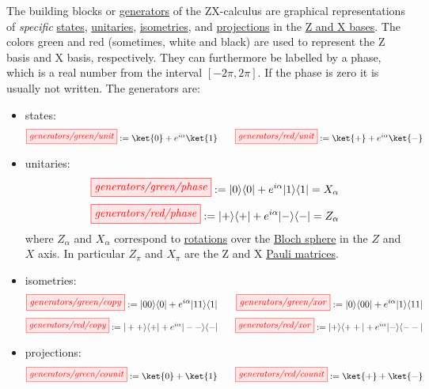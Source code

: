 \documentclass[a4paper, 12pt]{article}
\begin{document}
The building blocks or \underline{generators} of the ZX-calculus are graphical
representations of \emph{specific} \underline{states}, \underline{unitaries},
\underline{isometries}, and \underline{projections} in the \underline{Z and X
  bases}.
The colors green and red (sometimes, white and black) are used to represent the
Z basis and X basis, respectively.
They can furthermore be labelled by a phase, which is a real number from the
interval $[-2\pi, 2\pi]$.
If the phase is zero it is usually not written.
The generators are:
\begin{itemize}
\item states:
  \begin{equation*}
    \tikzfig{generators/green/unit} := \ket{0} + e^{i \alpha} \ket{1} 
    \qquad
    \tikzfig{generators/red/unit} := \ket{+} + e^{i \alpha} \ket{-}
  \end{equation*}

\item unitaries:
  \begin{equation*}
    \tikzfig{generators/green/phase} := | 0 \rangle \langle 0 | + e^{i \alpha} | 1 \rangle \langle 1 | = X_\alpha
  \end{equation*}
  \vspace{1mm}
  \begin{equation*}
    \tikzfig{generators/red/phase} := | + \rangle \langle + | + e^{i \alpha} | - \rangle \langle - | = Z_\alpha
  \end{equation*}
  where $Z_\alpha$ and $X_\alpha$ correspond to \underline{rotations} over the
  \underline{Bloch sphere}  in the $Z$ and $X$ axis. In particular $Z_\pi$ and
  $X_\pi$ are the Z and X \underline{Pauli matrices}.

\item isometries:
  \begin{equation*}
    \tikzfig{generators/green/copy} := | 00 \rangle \langle 0 | + e^{i \alpha} |11 \rangle \langle 1 |
    \qquad
    \tikzfig{generators/green/xor} := | 0 \rangle \langle 00 | + e^{i \alpha} | 1 \rangle \langle 11 |
  \end{equation*}
  \begin{equation*}
    \tikzfig{generators/red/copy} := | ++ \rangle \langle + | + e^{i \alpha} |-- \rangle \langle - |
    \qquad
    \tikzfig{generators/red/xor} := | + \rangle \langle ++ | + e^{i \alpha} | - \rangle \langle -- |
  \end{equation*}

\item projections:
  \begin{equation*}
    \tikzfig{generators/green/counit} := \ket{0} + \ket{1}
    \qquad
    \tikzfig{generators/red/counit} := \ket{+} + \ket{-}
  \end{equation*}
\end{itemize}
\end{document}
